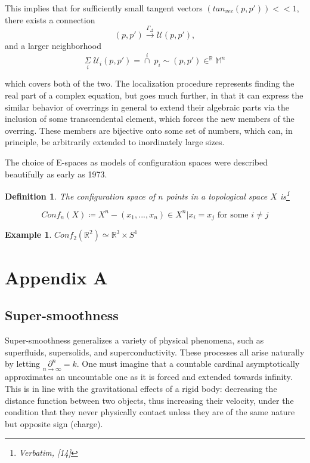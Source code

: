 \documentclass{article}
\newtheorem{dn}{Definition}
\newtheorem{eg}{Example}
\begin{document}
		This implies that for sufficiently small tangent vectors $(tan_{vec}(p,p')) << 1$, there exists a connection $$(p,p')\xrightarrow{\Gamma_\Delta}\mathcal{U}(p,p'),$$ and a larger neighborhood 
		$$\underset{i}{\Sigma} \; \mathcal{U}_i(p,p') = \overset{i}{\cap}\;p_i\sim (p,p')\in^\mathbb{R}\mathbb{M}^n$$
		
		which covers both of the two. The localization procedure represents finding the real part of a complex equation, but goes much further, in that it can express the similar behavior of overrings in general to extend their algebraic parts via the inclusion of some transcendental element, which forces the new members of the overring. These members are bijective onto some set of numbers, which can, in principle, be arbitrarily extended to inordinately large sizes.
		
		The choice of E-spaces as models of configuration spaces were described beautifully as early as 1973.
		
		\begin{dn}
			The configuration space of $n$ points in a topological space $X$ is\footnote{Verbatim, [14]}
			
			$$Conf_n(X)\coloneq X^n -{(x_1,...,x_n) \in X^n | x_i = x_j \text{ for some } i\neq j}$$
		\end{dn}
		
		\begin{eg}
			$Conf_2(\mathbb{R}^2) \simeq \mathbb{R}^3 \times S^1$
		\end{eg}
		
		
		
		\pagebreak
		
		\section{Appendix A}
		
		\subsection{Super-smoothness}
		Super-smoothness generalizes a variety of physical phenomena, such as superfluids, supersolids, and superconductivity. These processes all arise naturally by letting   $\underset{n\to\infty}{\partial^n} = k$. One must imagine that a countable cardinal asymptotically approximates an uncountable one as it is forced and extended towards infinity. This is in line with the gravitational effects of a rigid body: decreasing the distance function between two objects, thus increasing their velocity, under the condition that they never physically contact unless they are of the same nature but opposite sign (charge).
		
\end{document}
